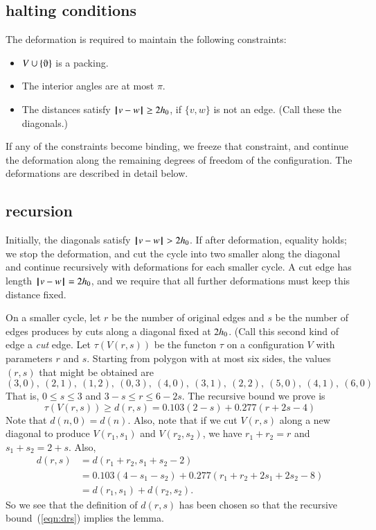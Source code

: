 \subsection{halting conditions}

The deformation is required to maintain the following
constraints:
\begin{itemize}
\item $V\cup\{\orgn\}$ is a packing.
\item The interior angles are at most $\pi$.
\item The distances satisfy ${\hskip0.1em|\hskip-0.15em|\hskip0.1em}v - w{\hskip0.1em|\hskip-0.15em|\hskip0.1em}\ge 2{h_0}$, if $\{v,w\}$ is
not an edge.  (Call these the diagonals.)
\end{itemize}
If any of the constraints become binding, we freeze that
constraint, and continue the deformation along the remaining degrees of freedom of the configuration.  The deformations are described in detail below.

\subsection{recursion}

Initially, the diagonals satisfy ${\hskip0.1em|\hskip-0.15em|\hskip0.1em}v - w{\hskip0.1em|\hskip-0.15em|\hskip0.1em}>2{h_0}$.
If after deformation, equality holds; we stop the deformation, and cut the cycle into two smaller along the diagonal
and continue recursively with deformations for each smaller cycle.  A cut edge has length ${\hskip0.1em|\hskip-0.15em|\hskip0.1em}v - w{\hskip0.1em|\hskip-0.15em|\hskip0.1em}=2{h_0}$, and
we require that all further deformations must keep this distance fixed.  

On a smaller cycle, let $r$ be the number of original edges and $s$ be the number of edges produces by cuts along a diagonal fixed at $2{h_0}$.  (Call this second kind of edge a {\it cut} edge.  Let $\tau(V(r,s))$ be the functon $\tau$ on a configuration $V$ with parameters $r$ and $s$.  Starting from polygon with at most six sides, the values $(r,s)$ that might be obtained are
$$
(3,0),~(2,1),~(1,2),~(0,3),~
(4,0),~(3,1),~(2,2),~
(5,0),~(4,1),~
(6,0)
$$
That is, $0\le s\le 3$ and $3-s\le r\le 6-2s$.
The recursive bound we prove is
\begin{equation}\label{eqn:drs}
\tau(V(r,s)) \ge d(r,s) = 0.103 (2-s) + 0.277 (r+2s-4) 
\end{equation}
Note that $d(n,0) = d(n)$. Also, note that if we cut
$V(r,s)$ along a new diagonal to produce $V(r_1,s_1)$
and $V(r_2,s_2)$, we have $r_1+r_2=r$ and $s_1+s_2 = 2+s$.
Also,
$$
\begin{array}{lll}
d(r,s) &= d(r_1+r_2,s_1+s_2-2) \\
  &=0.103 (4-s_1-s_2) + 0.277 (r_1+r_2+2s_1+2s_2-8) \\
  &=d(r_1,s_1) + d(r_2,s_2).
\end{array}
$$
So we see that the definition of $d(r,s)$ has been
chosen so that the recursive 
bound~(\ref{eqn:drs}) implies the
lemma.

